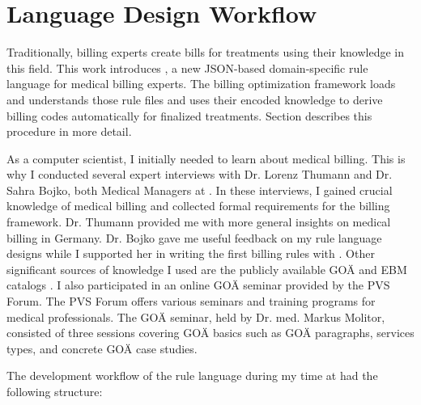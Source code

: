 \section{Language Design Workflow}\label{sec:language-design-workflow}
Traditionally, billing experts create bills for treatments using their knowledge in this field.
This work introduces \RL, a new JSON-based domain-specific rule language for medical billing experts.
The billing optimization framework loads and understands those rule files and uses their encoded knowledge to derive billing codes automatically for finalized treatments.
Section  describes this procedure in more detail.

As a computer scientist, I initially needed to learn about medical billing.
This is why I conducted several expert interviews with Dr. Lorenz Thumann and Dr. Sahra Bojko, both Medical Managers at \AV.
In these interviews, I gained crucial knowledge of medical billing and collected formal requirements for the billing framework.
Dr. Thumann provided me with more general insights on medical billing in Germany.
Dr. Bojko gave me useful feedback on my rule language designs while I supported her in writing the first billing rules with \RL.
Other significant sources of knowledge I used are the publicly available GOÄ and EBM catalogs \cite{hermanns2015ebm, bruck1998kommentar}.
I also participated in an online GOÄ seminar provided by the PVS Forum.
The PVS Forum offers various seminars and training programs for medical professionals.
The GOÄ seminar, held by Dr. med. Markus Molitor,
consisted of three sessions covering GOÄ basics such as GOÄ paragraphs, services types, and concrete GOÄ case studies.

The development workflow of the rule language during my time at \AV had the following structure:

